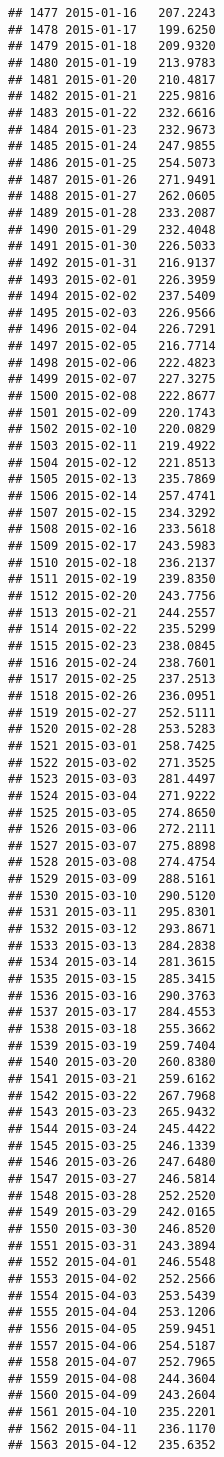 \documentclass[
]{article}
\begin{document}
\begin{verbatim}
## 1477 2015-01-16   207.2243
## 1478 2015-01-17   199.6250
## 1479 2015-01-18   209.9320
## 1480 2015-01-19   213.9783
## 1481 2015-01-20   210.4817
## 1482 2015-01-21   225.9816
## 1483 2015-01-22   232.6616
## 1484 2015-01-23   232.9673
## 1485 2015-01-24   247.9855
## 1486 2015-01-25   254.5073
## 1487 2015-01-26   271.9491
## 1488 2015-01-27   262.0605
## 1489 2015-01-28   233.2087
## 1490 2015-01-29   232.4048
## 1491 2015-01-30   226.5033
## 1492 2015-01-31   216.9137
## 1493 2015-02-01   226.3959
## 1494 2015-02-02   237.5409
## 1495 2015-02-03   226.9566
## 1496 2015-02-04   226.7291
## 1497 2015-02-05   216.7714
## 1498 2015-02-06   222.4823
## 1499 2015-02-07   227.3275
## 1500 2015-02-08   222.8677
## 1501 2015-02-09   220.1743
## 1502 2015-02-10   220.0829
## 1503 2015-02-11   219.4922
## 1504 2015-02-12   221.8513
## 1505 2015-02-13   235.7869
## 1506 2015-02-14   257.4741
## 1507 2015-02-15   234.3292
## 1508 2015-02-16   233.5618
## 1509 2015-02-17   243.5983
## 1510 2015-02-18   236.2137
## 1511 2015-02-19   239.8350
## 1512 2015-02-20   243.7756
## 1513 2015-02-21   244.2557
## 1514 2015-02-22   235.5299
## 1515 2015-02-23   238.0845
## 1516 2015-02-24   238.7601
## 1517 2015-02-25   237.2513
## 1518 2015-02-26   236.0951
## 1519 2015-02-27   252.5111
## 1520 2015-02-28   253.5283
## 1521 2015-03-01   258.7425
## 1522 2015-03-02   271.3525
## 1523 2015-03-03   281.4497
## 1524 2015-03-04   271.9222
## 1525 2015-03-05   274.8650
## 1526 2015-03-06   272.2111
## 1527 2015-03-07   275.8898
## 1528 2015-03-08   274.4754
## 1529 2015-03-09   288.5161
## 1530 2015-03-10   290.5120
## 1531 2015-03-11   295.8301
## 1532 2015-03-12   293.8671
## 1533 2015-03-13   284.2838
## 1534 2015-03-14   281.3615
## 1535 2015-03-15   285.3415
## 1536 2015-03-16   290.3763
## 1537 2015-03-17   284.4553
## 1538 2015-03-18   255.3662
## 1539 2015-03-19   259.7404
## 1540 2015-03-20   260.8380
## 1541 2015-03-21   259.6162
## 1542 2015-03-22   267.7968
## 1543 2015-03-23   265.9432
## 1544 2015-03-24   245.4422
## 1545 2015-03-25   246.1339
## 1546 2015-03-26   247.6480
## 1547 2015-03-27   246.5814
## 1548 2015-03-28   252.2520
## 1549 2015-03-29   242.0165
## 1550 2015-03-30   246.8520
## 1551 2015-03-31   243.3894
## 1552 2015-04-01   246.5548
## 1553 2015-04-02   252.2566
## 1554 2015-04-03   253.5439
## 1555 2015-04-04   253.1206
## 1556 2015-04-05   259.9451
## 1557 2015-04-06   254.5187
## 1558 2015-04-07   252.7965
## 1559 2015-04-08   244.3604
## 1560 2015-04-09   243.2604
## 1561 2015-04-10   235.2201
## 1562 2015-04-11   236.1170
## 1563 2015-04-12   235.6352

\end{verbatim}
\end{document}

